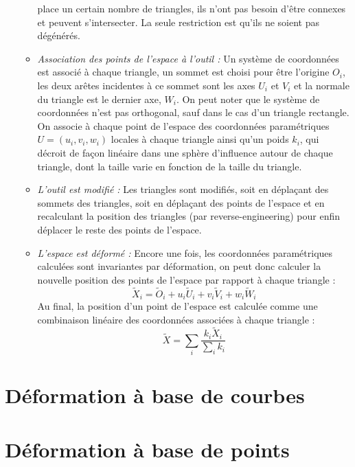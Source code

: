 \begin{itemize}
\begin{itemize}
    place un certain nombre de triangles, ils n'ont pas besoin d'être
    connexes et peuvent s'intersecter. La seule restriction est qu'ils
    ne soient pas dégénérés.
  \item{\textit{Association des points de l'espace à l'outil :}} Un
    système de coordonnées est associé à chaque triangle, un sommet
    est choisi pour être l'origine \( O_i \), les deux arêtes
    incidentes à ce sommet sont les axes \( U_i \) et \( V_i \) et la
    normale du triangle est le dernier axe, \( W_i \). On peut noter
    que le système de coordonnées n'est pas orthogonal, sauf dans le
    cas d'un triangle rectangle. On associe à chaque point de l'espace
    des coordonnées paramétriques \( U = (u_i,v_i,w_i) \) locales à
    chaque triangle ainsi qu'un poids \( k_i \), qui décroit de façon
    linéaire dans une sphère d'influence autour de chaque triangle,
    dont la taille varie en fonction de la taille du triangle.
  \item{\textit{L'outil est modifié :}} Les triangles sont modifiés,
    soit en déplaçant des sommets des triangles, soit en déplaçant des
    points de l'espace et en recalculant la position des triangles
    (par reverse-engineering) pour enfin déplacer le reste des points
    de l'espace.
  \item{\textit{L'espace est déformé :}} Encore une fois, les coordonnées
    paramétriques calculées sont invariantes par déformation, on peut
    donc calculer la nouvelle position des points de l'espace par
    rapport à chaque triangle :
    \begin{equation}
      \tilde{X}_i = \tilde{O}_i + u_i\tilde{U}_i + v_i\tilde{V}_i +
      w_i\tilde{W}_i
    \end{equation}
 Au final, la position d'un point de l'espace est calculée comme une
 combinaison linéaire des coordonnées associées à chaque triangle :
    \begin{equation}
      \tilde{X} = \sum_i \frac{k_i\tilde{X}_i}{\sum_i k_i}
    \end{equation}
  \end{itemize}
\end{itemize}

\section{Déformation à base de courbes}

\section{Déformation à base de points}

